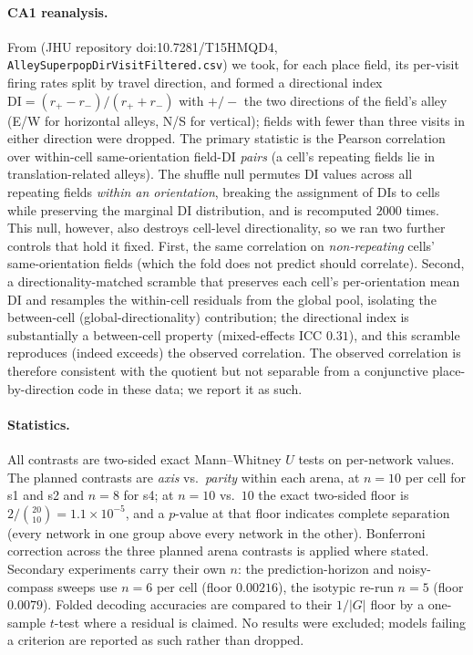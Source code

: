 \documentclass[9pt,lineno]{elife}
\begin{document}
\paragraph{CA1 reanalysis.} From \citet{hockeimer2023} (JHU repository doi:10.7281/T15HMQD4,
\texttt{AlleySuperpopDirVisitFiltered.csv}) we took, for each place field, its per-visit firing
rates split by travel direction, and formed a directional index $\mathrm{DI} = (r_+ - r_-)/(r_+ +
r_-)$ with $+/-$ the two directions of the field's alley (E/W for horizontal alleys, N/S for
vertical); fields with fewer than three visits in either direction were dropped. The primary
statistic is the Pearson correlation over within-cell same-orientation field-DI \emph{pairs}
(a cell's repeating fields lie in translation-related alleys). The shuffle null permutes DI values
across all repeating fields \emph{within an orientation}, breaking the assignment of DIs to cells
while preserving the marginal DI distribution, and is recomputed $2000$ times. This null, however,
also destroys cell-level directionality, so we ran two further controls that hold it fixed. First,
the same correlation on \emph{non-repeating} cells' same-orientation fields (which the fold does
not predict should correlate). Second, a directionality-matched scramble that preserves each cell's
per-orientation mean DI and resamples the within-cell residuals from the global pool, isolating the
between-cell (global-directionality) contribution; the directional index is substantially a
between-cell property (mixed-effects ICC $0.31$), and this scramble reproduces (indeed exceeds) the
observed correlation. The observed correlation is
therefore consistent with the quotient but not separable from a conjunctive place-by-direction code
in these data; we report it as such.

\paragraph{Statistics.} All contrasts are two-sided exact Mann--Whitney $U$ tests on per-network
values. The planned contrasts are \textit{axis} vs.\ \textit{parity} within each arena, at
$n = 10$ per cell for s1 and s2 and $n = 8$ for s4; at $n = 10$ vs.\ $10$ the exact two-sided
floor is $2/\binom{20}{10} = 1.1\times10^{-5}$, and a $p$-value at that floor indicates complete
separation (every network in one group above every network in the other). Bonferroni correction
across the three planned arena contrasts is applied where stated. Secondary experiments carry
their own $n$: the prediction-horizon and noisy-compass sweeps use $n = 6$ per cell (floor
$0.00216$), the isotypic re-run $n = 5$ (floor $0.0079$). Folded decoding accuracies are compared
to their $1/|G|$ floor by a one-sample $t$-test where a residual is claimed. No results were
excluded; models failing a criterion are reported as such rather than dropped.
\end{document}
